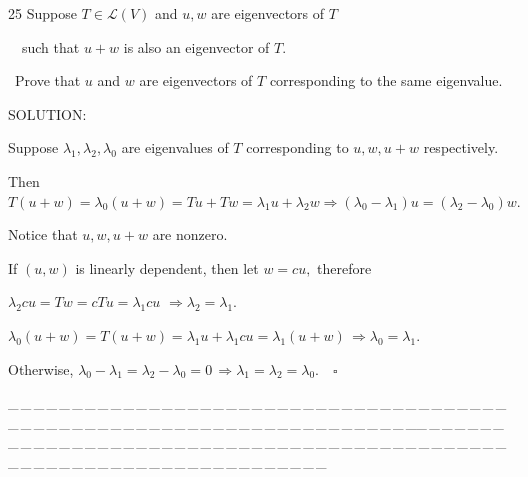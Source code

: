 \documentclass[a4paper, 11pt, UTF8]{article}
\def\Lm{\mathcal{L}}
\begin{document}
\begin{large}
{\timesbf\Large 25} {\timessl\Large 
Suppose $T\in\Lm(V)$ and $u, w$ are eigenvectors of $T$}\par\qquad\qquad\qquad\qquad\qquad\,\,\,\,
{\timessl\Large such that $u + w$ is also an eigenvector of $T$.}\par\quad\,
{\timessl\Large Prove that $u$ and $w$ are eigenvectors of $T$ corresponding to the same eigenvalue.}\par
{\timesbf S\footnotesize{OLUTION:}}\par\quad
Suppose $\lambda_1,\lambda_2,\lambda_0$ are eigenvalues of $T$ corresponding to $u,w,u+w$ respectively.\par\quad
Then $T(u+w)=\lambda_0(u+w)=Tu+Tw=\lambda_1 u+\lambda_2 w\Rightarrow (\lambda_0-\lambda_1)u=(\lambda_2-\lambda_0)w.$\par\quad
Notice that $u,w,u+w$ are nonzero.\par\quad
If $(u,w)$ is linearly dependent, then let $w=cu,$ therefore\par\qquad\qquad\qquad
$\lambda_2 cu=Tw=cTu=\lambda_1 cu$ \qquad\qquad\qquad\qquad\qquad\quad $\Rightarrow\lambda_2=\lambda_1.$\par\qquad\qquad\qquad
$\lambda_0(u+w)=T(u+w)=\lambda_1 u+\lambda_1 cu=\lambda_1(u+w)$\quad$\,\Rightarrow\lambda_0=\lambda_1.$\par\quad
Otherwise, $\lambda_0-\lambda_1=\lambda_2-\lambda_0=0\,\Rightarrow\lambda_1=\lambda_2=\lambda_0.\quad\square$\par
{\tiny \_\,\_\,\_\,\_\,\_\,\_\,\_\,\_\,\_\,\_\,\_\,\_\,\_\,\_\,\_\,\_\,\_\,\_\,\_\,\_\,\_\,\_\,\_\,\_\,\_\,\_\,\_\,\_\,\_\,\_\,\_\,\_\,\_\,\_\,\_\,\_\,\_\,\_\,\_\,\_\,\_\,\_\,\_\,\_\,\_\,\_\,\_\,\_\,\_\,\_\,\_\,\_\,\_\,\_\,\_\,\_\,\_\,\_\,\_\,\_\,\_\,\_\,\_\,\_\,\_\,\_\,\_\,\_\,\_\,\_\,\_\_\,\_\,\_\,\_\,\_\,\_\,\_\,\_\,\_\,\_\,\_\,\_\,\_\,\_\,\_\,\_\,\_\,\_\,\_\,\_\,\_\,\_\,\_\,\_\,\_\,\_\,\_\,\_\,\_\,\_\,\_\,\_\,\_\,\_\,\_\,\_\,\_\,\_\,\_\,\_\,\_\,\_\,\_\,\_\,\_\,\_\,\_\,\_\,\_\,\_\,\_\,\_\,\_\,\_\,\_\,\_\,\_\,\_\,\_\,\_\,\_\,\_\,\_\,\_\,\_\,\_\,\_\,\_\,\_\,\_\,\_}{\tiny\,\par}


\end{large}
\end{document}
